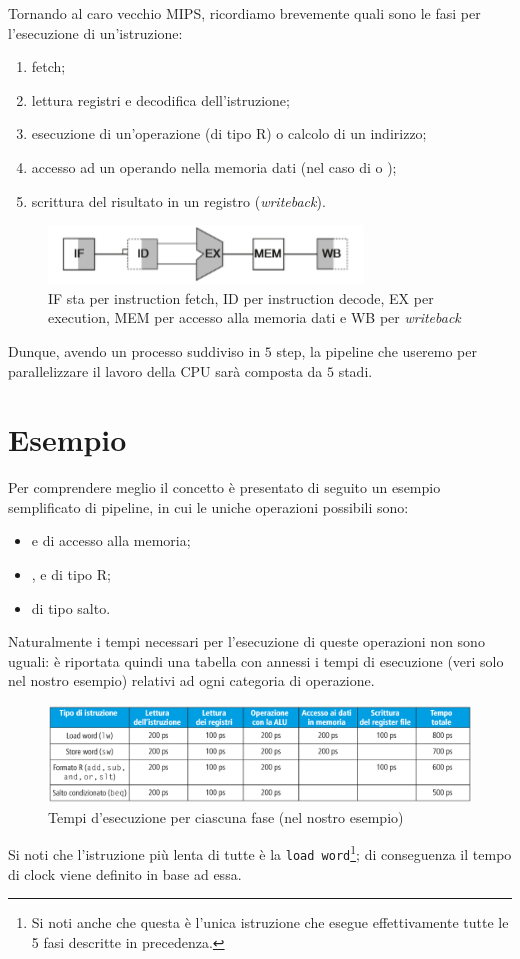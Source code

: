 \documentclass[class=book, crop=false, oneside]{standalone}
\begin{document}
Tornando al caro vecchio MIPS, ricordiamo brevemente quali sono le fasi per l'esecuzione di un'istruzione:
\begin{enumerate}[noitemsep]
	\item fetch;
	\item lettura registri e decodifica dell'istruzione;
	\item esecuzione di un'operazione (di tipo R) o calcolo di un indirizzo;
	\item accesso ad un operando nella memoria dati (nel caso di  o );
	\item scrittura del risultato in un registro (\emph{writeback}).
\end{enumerate}
\begin{figure}[H]
	\centering
	\includegraphics[width=.5\textwidth,keepaspectratio]{istruzione.png}
	\caption{IF sta per instruction fetch, ID per instruction decode, EX per execution, MEM per accesso alla memoria dati e WB per \emph{writeback}}
\end{figure}
Dunque, avendo un processo suddiviso in \(5\) step, la pipeline che useremo per parallelizzare il lavoro della CPU sarà composta da \(5\) stadi.

\section{Esempio}
Per comprendere meglio il concetto è presentato di seguito un esempio semplificato di pipeline, in cui le uniche operazioni possibili sono:
\begin{itemize}
	\item {} e  di accesso alla memoria;
	\item {},  e  di tipo R;
	\item {} di tipo salto.
\end{itemize}
Naturalmente i tempi necessari per l'esecuzione di queste operazioni non sono uguali: è riportata quindi una tabella con annessi i tempi di esecuzione (veri solo nel nostro esempio) relativi ad ogni categoria di operazione.
\begin{figure}[H]
	\centering
	\includegraphics[width=\textwidth,keepaspectratio]{tabella-tempi-operazioni.png}
	\caption{Tempi d'esecuzione per ciascuna fase (nel nostro esempio)}
\end{figure}
Si noti che l'istruzione più lenta di tutte è la \texttt{load word}\footnote{Si noti anche che questa è l'unica istruzione che esegue effettivamente tutte le 5 fasi descritte in precedenza.}; di conseguenza il tempo di clock viene definito in base ad essa.
\end{document}
